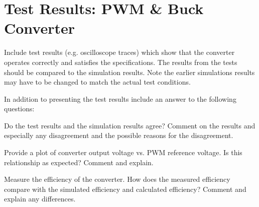 \section{Test Results: PWM \& Buck Converter}

Include test results (e.g. oscilloscope traces) which show that the converter operates correctly and satisfies the specifications. The results from the tests should be compared to the simulation results. Note the earlier simulations results may have to be changed to match the actual test conditions.

In addition to presenting the test results include an answer to the following questions:

    Do the test results and the simulation results agree? Comment on the results and especially any disagreement and the possible reasons for the disagreement.

    Provide a plot of converter output voltage vs. PWM reference voltage. Is this relationship as expected? Comment and explain.

    Measure the efficiency of the converter. How does the measured efficiency compare with the simulated efficiency and calculated efficiency? Comment and explain any differences.
